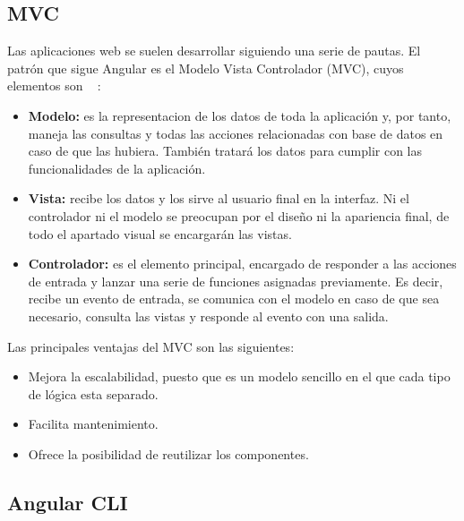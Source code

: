 \documentclass[a4paper, 12pt]{book}
\begin{document}
\subsection{MVC} 
\label{sec:mvc}

Las aplicaciones web se suelen desarrollar siguiendo una serie de pautas. El patrón que sigue Angular es el Modelo Vista Controlador (MVC), cuyos elementos son ~\cite{mvc} :

\begin{itemize}
  
	\item \textbf{Modelo:} es la representacion de los datos de toda la aplicación y, por tanto, maneja las consultas y todas las acciones relacionadas con base de datos en caso de que las hubiera. También tratará los datos para cumplir con las funcionalidades de la aplicación.
 
	\item \textbf{Vista:} recibe los datos y los sirve al usuario final en la interfaz. Ni el controlador ni el modelo se preocupan por el diseño ni la apariencia final, de todo el apartado visual se encargarán las vistas.

	\item \textbf{Controlador:} es el elemento principal, encargado de responder a las acciones de entrada y lanzar una serie de funciones asignadas previamente. Es decir, recibe un evento de entrada, se comunica con el modelo en caso de que sea necesario, consulta las vistas y responde al evento con una salida.

\end{itemize}

Las principales ventajas del MVC son las siguientes:

\begin{itemize}
  
	\item Mejora la escalabilidad, puesto que es un modelo sencillo en el que cada tipo de lógica esta separado.
 
	\item Facilita mantenimiento.

	\item Ofrece la posibilidad de reutilizar los componentes.

\end{itemize}

\subsection{Angular CLI} 
\label{sec:angularcli}
\end{document}
